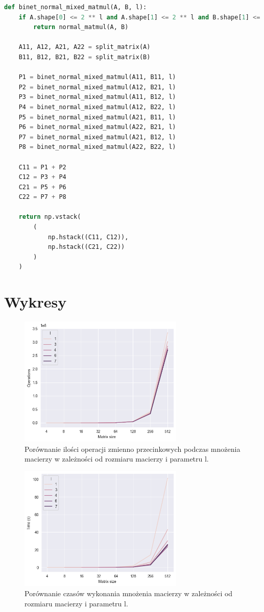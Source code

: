 \documentclass[a4paper]{article}
\begin{document}
\begin{lstlisting}[language=python]
def binet_normal_mixed_matmul(A, B, l):
    if A.shape[0] <= 2 ** l and A.shape[1] <= 2 ** l and B.shape[1] <= 2 ** l:
        return normal_matmul(A, B)

    A11, A12, A21, A22 = split_matrix(A)
    B11, B12, B21, B22 = split_matrix(B)

    P1 = binet_normal_mixed_matmul(A11, B11, l)
    P2 = binet_normal_mixed_matmul(A12, B21, l)
    P3 = binet_normal_mixed_matmul(A11, B12, l)
    P4 = binet_normal_mixed_matmul(A12, B22, l)
    P5 = binet_normal_mixed_matmul(A21, B11, l)
    P6 = binet_normal_mixed_matmul(A22, B21, l)
    P7 = binet_normal_mixed_matmul(A21, B12, l)
    P8 = binet_normal_mixed_matmul(A22, B22, l)

    C11 = P1 + P2
    C12 = P3 + P4
    C21 = P5 + P6
    C22 = P7 + P8

    return np.vstack(
        (
            np.hstack((C11, C12)),
            np.hstack((C21, C22))
        )
    )

\end{lstlisting}


\section{Wykresy}

\begin{figure}[H]
    \centering
    \includegraphics[width=0.7\textwidth]{images/opps.png}
    \caption{Porównanie ilości operacji zmienno przecinkowych podczas mnożenia macierzy w zależności od rozmiaru macierzy i parametru l.}
    \label{fig:opps}
\end{figure}


\begin{figure}[H]
    \centering
    \includegraphics[width=0.7\textwidth]{images/times.png}
    \caption{Porównanie czasów wykonania mnożenia macierzy w zależności od rozmiaru macierzy i parametru l.}
    \label{fig:times}
\end{figure}
\end{document}

